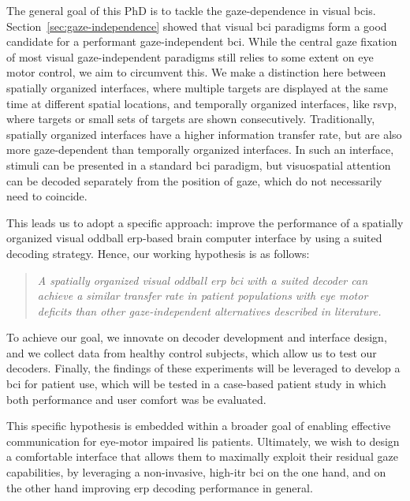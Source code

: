 The general goal of this PhD is to tackle the gaze-dependence in visual \ac{bci}s.
Section~\ref{sec:gaze-independence} showed that visual \ac{bci} paradigms form
a good candidate for a performant gaze-independent \ac{bci}.
While the central gaze fixation of most visual gaze-independent paradigms still
relies to some extent on eye motor control, we aim to circumvent this.
We make a distinction here between spatially organized interfaces, where
multiple targets are displayed at the same time at different spatial locations,
and temporally organized interfaces, like \ac{rsvp},
where targets or small sets of targets are shown consecutively.
Traditionally, spatially organized interfaces have a higher information transfer
rate, but are also more gaze-dependent than temporally organized interfaces.
In such an interface, stimuli can be presented in a standard \ac{bci} paradigm, but
visuospatial attention can be decoded separately from the position of gaze,
which do not necessarily need to coincide.

This leads us to adopt a specific approach: improve the performance of a
spatially organized visual oddball \ac{erp}-based brain
computer interface by using a suited decoding strategy.
Hence, our working hypothesis is as follows:
\begin{quote}
	\textit{A spatially organized visual oddball \ac{erp} \ac{bci} with a suited decoder
		can achieve a similar transfer rate in patient
		populations with eye motor deficits than other gaze-independent alternatives
    described in literature.}
\end{quote}

To achieve our goal, we innovate on decoder development and interface design,
and we collect data from healthy control subjects, which allow us to test our decoders.
Finally, the findings of these experiments will be leveraged to develop a \ac{bci}
for patient use, which will be tested in a case-based patient study in which
both performance and user comfort was be evaluated.

This specific hypothesis is embedded within a broader goal of enabling
effective communication for eye-motor impaired \ac{lis} patients.
Ultimately, we wish to design a comfortable interface that allows them to maximally exploit
their residual gaze capabilities, by leveraging a non-invasive, high-\ac{itr}
\ac{bci} on the one hand, and on the other hand improving \ac{erp} decoding performance
in general.

